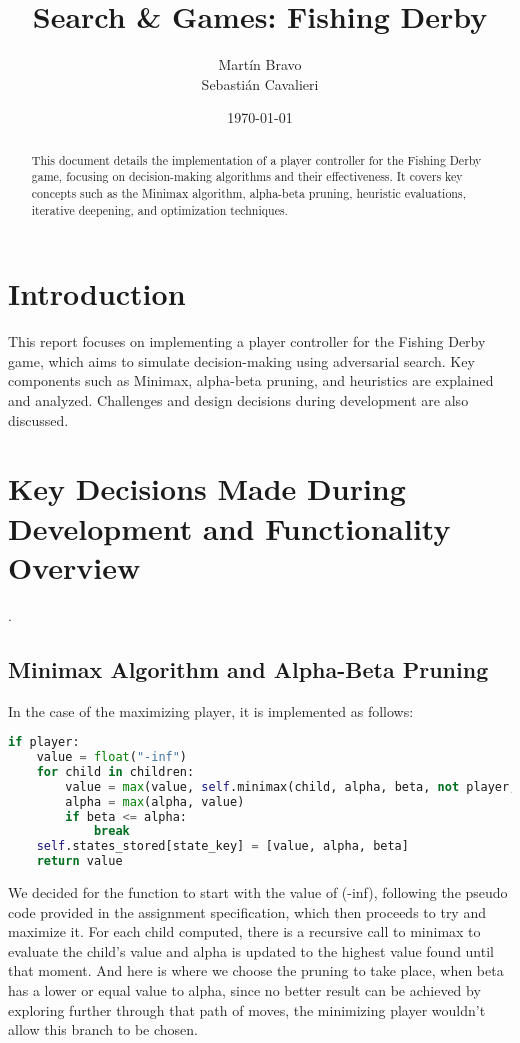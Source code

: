 \documentclass[12pt]{article}
\title{\textbf{Search \& Games: Fishing Derby}}
\author{
    Martín Bravo \\
    Sebastián Cavalieri
}
\date{\today}
\begin{document}
\maketitle

\begin{abstract}
This document details the implementation of a player controller for the Fishing Derby game, focusing on decision-making algorithms and their effectiveness. It covers key concepts such as the Minimax algorithm, alpha-beta pruning, heuristic evaluations, iterative deepening, and optimization techniques.
\end{abstract}

\tableofcontents
\newpage

\section{Introduction}
This report focuses on implementing a player controller for the Fishing Derby game, which aims to simulate decision-making using adversarial search. Key components such as Minimax, alpha-beta pruning, and heuristics are explained and analyzed. Challenges and design decisions during development are also discussed.

\section{Key Decisions Made During Development and Functionality Overview}.

\subsection{Minimax Algorithm and Alpha-Beta Pruning}

In the case of the maximizing player, it is implemented as follows:
\begin{lstlisting}[language=Python, caption=Minimax implementation]
if player:
    value = float("-inf")
    for child in children:
        value = max(value, self.minimax(child, alpha, beta, not player, max_depth))
        alpha = max(alpha, value)
        if beta <= alpha:
            break
    self.states_stored[state_key] = [value, alpha, beta]
    return value
\end{lstlisting}
We decided for the function to start with the value of (-inf), following the pseudo code provided in the assignment specification, which then proceeds to try and maximize it. For each child computed, there is a recursive call to minimax to evaluate the child's value and alpha is updated to the highest value found until that moment. And here is where we choose the pruning to take place, when beta has a lower or equal value to alpha, since no better result can be achieved by exploring further through that path of moves, the minimizing player wouldn't allow this branch to be chosen.
\end{document}
